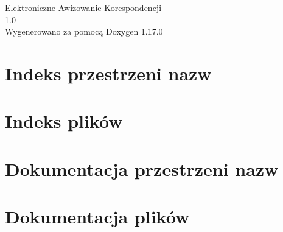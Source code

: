 \documentclass[twoside]{book}
\newcommand{\+}{\discretionary{\mbox{\scriptsize$\hookleftarrow$}}{}{}}
\newcommand{\clearemptydoublepage}{%
    \newpage{\pagestyle{empty}\cleardoublepage}%
  }
\begin{document}
  \raggedbottom
    \hypersetup{pageanchor=false,
                bookmarksnumbered=true,
                pdfencoding=unicode
               }
  \begin{titlepage}
  \vspace*{7cm}
  \begin{center}%
  {\Large Elektroniczne Awizowanie Korespondencji}\\
  [1ex]\large 1.\+0 \\
  \vspace*{1cm}
  {\large Wygenerowano za pomocą Doxygen 1.17.0}\\
  \end{center}
  \end{titlepage}
  \clearemptydoublepage
  \tableofcontents
  \clearemptydoublepage
  \hypersetup{pageanchor=true}

\chapter{Indeks przestrzeni nazw}

\chapter{Indeks plików}

\chapter{Dokumentacja przestrzeni nazw}







\chapter{Dokumentacja plików}








  \backmatter
  \newpage
  \clearemptydoublepage
  \printindex
\end{document}
